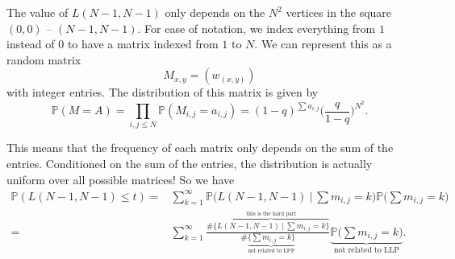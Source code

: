The value of $L(N-1,N-1)$ only depends on the $N^2$ vertices in the square $(0,0)$ -- $(N-1,N-1)$. For ease of notation, we index everything from $1$ instead of $0$ to have a matrix indexed from $1$ to $N$. We can represent this as a random matrix \[
M_{x,y} = (w_{(x,y)})
\]
with integer entries. The distribution of this matrix is given by \[
\mathbb{P}(M=A) = \prod_{i,j\leq N} \mathbb{P}(M_{i,j} = a_{i,j}) = (1-q)^{\sum a_{i,j}} \Big(\frac{q}{1-q}\Big)^{N^2}.
\]

This means that the frequency of each matrix only depends on the sum of the entries. Conditioned on the sum of the entries, the distribution is actually uniform over all possible matrices! So we have \begin{align*}
    \mathbb{P}(L(N-1,N-1)\leq t) =& \sum_{k=1}^{\infty} \mathbb{P}\Big(L(N-1,N-1) \ |\ \sum m_{i,j}=k\Big)\mathbb{P}\Big(\sum m_{i,j}=k\Big)\\
    =& \sum_{k=1}^{\infty} \frac{\#\overbrace{ \{L(N-1,N-1) \ |\ \sum m_{i,j}=k\}}^{\text{this is the hard part}}}{\#\underbrace{\{ \sum m_{i,j}=k\}}_{\text{not related to LPP}}} \underbrace{\mathbb{P}\Big(\sum m_{i,j}=k\Big)}_{\text{not related to LLP}}.
\end{align*}